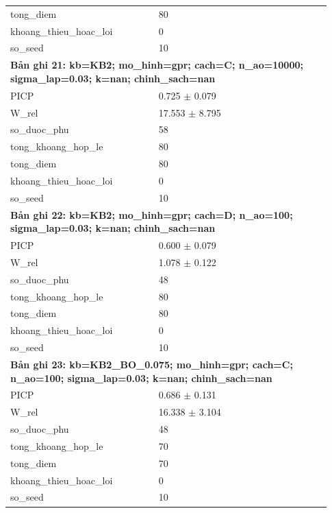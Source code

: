 \begin{longtable}{p{0.43\linewidth}p{0.50\linewidth}}
tong\_\allowbreak diem & 80 \\
khoang\_\allowbreak thieu\_\allowbreak hoac\_\allowbreak loi & 0 \\
so\_\allowbreak seed & 10 \\
\midrule
\multicolumn{2}{p{0.95\linewidth}}{\textbf{Bản ghi 21: kb=KB2; mo\_hinh=gpr; cach=C; n\_ao=10000; sigma\_lap=0.03; k=nan; chinh\_sach=nan}} \\
PICP & 0.725 $\pm$ 0.079 \\
W\_\allowbreak rel & 17.553 $\pm$ 8.795 \\
so\_\allowbreak duoc\_\allowbreak phu & 58 \\
tong\_\allowbreak khoang\_\allowbreak hop\_\allowbreak le & 80 \\
tong\_\allowbreak diem & 80 \\
khoang\_\allowbreak thieu\_\allowbreak hoac\_\allowbreak loi & 0 \\
so\_\allowbreak seed & 10 \\
\midrule
\multicolumn{2}{p{0.95\linewidth}}{\textbf{Bản ghi 22: kb=KB2; mo\_hinh=gpr; cach=D; n\_ao=100; sigma\_lap=0.03; k=nan; chinh\_sach=nan}} \\
PICP & 0.600 $\pm$ 0.079 \\
W\_\allowbreak rel & 1.078 $\pm$ 0.122 \\
so\_\allowbreak duoc\_\allowbreak phu & 48 \\
tong\_\allowbreak khoang\_\allowbreak hop\_\allowbreak le & 80 \\
tong\_\allowbreak diem & 80 \\
khoang\_\allowbreak thieu\_\allowbreak hoac\_\allowbreak loi & 0 \\
so\_\allowbreak seed & 10 \\
\midrule
\multicolumn{2}{p{0.95\linewidth}}{\textbf{Bản ghi 23: kb=KB2\_BO\_0.075; mo\_hinh=gpr; cach=C; n\_ao=100; sigma\_lap=0.03; k=nan; chinh\_sach=nan}} \\
PICP & 0.686 $\pm$ 0.131 \\
W\_\allowbreak rel & 16.338 $\pm$ 3.104 \\
so\_\allowbreak duoc\_\allowbreak phu & 48 \\
tong\_\allowbreak khoang\_\allowbreak hop\_\allowbreak le & 70 \\
tong\_\allowbreak diem & 70 \\
khoang\_\allowbreak thieu\_\allowbreak hoac\_\allowbreak loi & 0 \\
so\_\allowbreak seed & 10 \\

\end{longtable}
